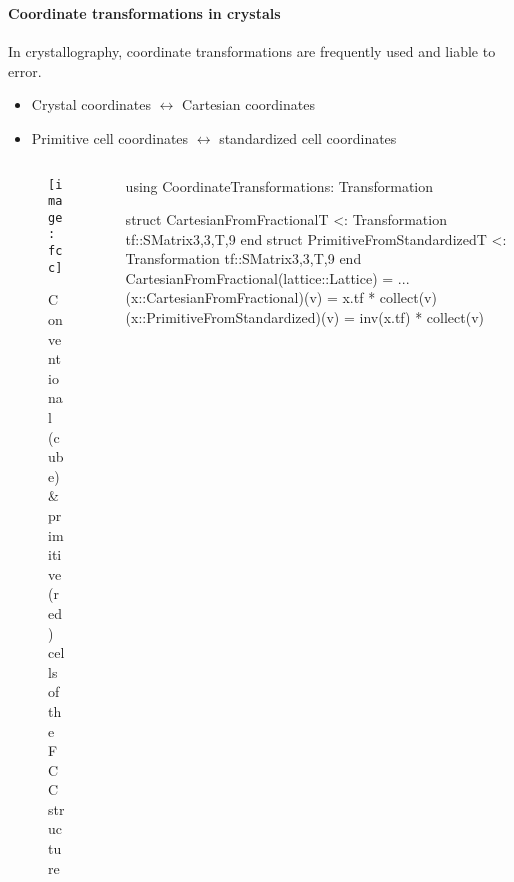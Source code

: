 \begin{frame}[fragile]
    \frametitle{\subsubsecname}
    \framesubtitle{Coordinate transformations in crystals}

    In crystallography, coordinate transformations are frequently used and liable to error.
    \begin{itemize}
        \item Crystal coordinates $\leftrightarrow$ Cartesian coordinates
        \item Primitive cell coordinates $\leftrightarrow$ standardized cell coordinates
    \end{itemize}

    \begin{columns}[t]
        \begin{column}[T, onlytextwidth]{0.2\textwidth}
            \begin{figure}
                \texttt{[image: fcc]}
                \captionsetup{font=tiny}
                \caption{Conventional (cube) \& primitive (red) cells of the FCC structure}
            \end{figure}
        \end{column}

        \begin{column}[T]{0.8\textwidth}
            {\scriptsize
                \begin{algorithmblock}
                    \begin{juliaverbatim}
using CoordinateTransformations: Transformation

struct CartesianFromFractional{T} <: Transformation
    tf::SMatrix{3,3,T,9}
end
struct PrimitiveFromStandardized{T} <: Transformation
    tf::SMatrix{3,3,T,9}
end
CartesianFromFractional(lattice::Lattice) = ...
(x::CartesianFromFractional)(v) = x.tf * collect(v)
(x::PrimitiveFromStandardized)(v) = inv(x.tf) * collect(v)
        \end{juliaverbatim}
                \end{algorithmblock}
            }
        \end{column}
    \end{columns}
\end{frame}
